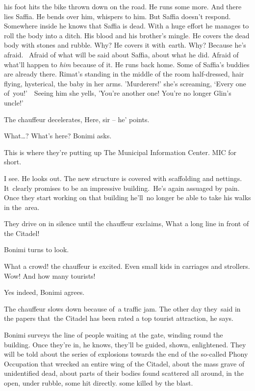 \documentclass[letterpaper]{article}
\begin{document}
his foot hits the bike thrown down on the road. He runs some more. And there lies Saffia. He bends over him, whispers
to him. But Saffia doesn't respond. Somewhere inside he knows that Saffia is dead. With a huge effort he manages to
roll the body into a ditch. His blood and his brother's mingle\textcolor{red}{. }He covers the dead body with stones
and rubble. Why? He covers it with\ earth. Why? Because he's afraid. ~Afraid of what will be said about Saffia, about
what he did. Afraid of what'll happen to \textit{him} because of it. He runs back home. Some of Saffia's buddies are
already there. Rimat's standing in the middle of the room half-dressed, hair flying, hysterical, the baby in her arms.
{}'Murderers!{}' she{}'s screaming, `Every one of~you!'\ \ Seeing him she yells, {}'You're another one! You're no
longer Glin's uncle!'

The chauffeur decelerates, {\textquotedbl}Here, sir --{\textquotedbl} he{}' points.

{\textquotedbl}What{\dots}? What's here?{\textquotedbl} Bonimi asks. 

{\textquotedbl}This is where they're putting up The Municipal Information Center. MIC for short.{\textquotedbl} 

{\textquotedbl}I see.{\textquotedbl} He looks out. The new structure is covered with scaffolding and nettings.
It\textcolor{red}{\ }clearly promises to be an impressive building.\ He{}'s again assuaged by pain. Once they start
working on that building he'll\ no longer be able to take his walks in the\ area. 

They drive on in silence until the chauffeur exclaims, {\textquotedbl}What a long line in front of the
Citadel!{\textquotedbl}

Bonimi turns to look. 

{\textquotedbl}What a crowd!{\textquotedbl} the chauffeur is excited. {\textquotedbl}Even small kids in carriages and
strollers. Wow! And how many tourists!{\textquotedbl}

{\textquotedbl}Yes indeed,{\textquotedbl} Bonimi agrees. 

The chauffeur slows down because of\ a traffic jam. {\textquotedbl}The other day they\ said in the papers that\ the
Citadel has been rated a top tourist attraction,{\textquotedbl} he says.

Bonimi surveys the line of people waiting at the gate, winding round the building. Once they're in, he knows, they'll be
guided, shown, enlightened. They will be told about the series of explosions towards the end of the so-called Phony
Occupation that wrecked an entire wing of the Citadel, about the mass grave of unidentified dead, about parts of their
bodies found scattered all around, in the open, under rubble, some hit directly. some killed by the blast.
\end{document}
